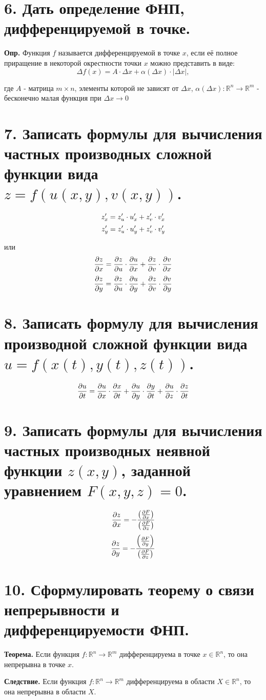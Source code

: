 \documentclass[11pt]{article}
\begin{document}
\section*{6. Дать определение ФНП, дифференцируемой в точке.}
\par\textbf{Опр.} Функция $f$ называется дифференцируемой в точке $x$, если её полное приращение в некоторой окрестности точки $x$ можно представить в виде:
$$\Delta f(x) = A \cdot \Delta x + \alpha(\Delta x) \cdot |\Delta x|,$$
\par где $A$ - матрица $m \times n$, элементы которой не зависят от $\Delta x$, $\alpha(\Delta x): \mathbb{R}^{n} \to \mathbb{R}^{m}$ - бесконечно малая функция при $\Delta x \to 0$
\section*{7. Записать формулы для вычисления частных производных сложной функции вида $z = f(u(x, y), v(x, y))$.}
$$\large z'_{x} = z'_{u} \cdot u'_{x} + z'_{v} \cdot v'_{x}$$
$$\large z'_{y} = z'_{u} \cdot u'_{y} + z'_{v} \cdot v'_{y}$$
\par или
$$\large \frac{\partial z}{\partial x} = \frac{\partial z}{\partial u} \cdot\frac{\partial u}{\partial x} + \frac{\partial z}{\partial v} \cdot \frac{\partial v}{\partial x}$$
$$\large \frac{\partial z}{\partial y} = \frac{\partial z}{\partial u} \cdot\frac{\partial u}{\partial y} + \frac{\partial z}{\partial v} \cdot \frac{\partial v}{\partial y}$$
\section*{8. Записать формулу для вычисления производной сложной функции вида $u = f(x(t), y(t), z(t))$.}
$$\large \frac{\partial u}{\partial t} = \frac{\partial u}{\partial x} \cdot \frac{\partial x}{\partial t} + \frac{\partial u}{\partial y} \cdot \frac{\partial y}{\partial t} + \frac{\partial u}{\partial z} \cdot \frac{\partial z}{\partial t}$$
\section*{9. Записать формулы для вычисления частных производных неявной функции $z(x, y)$, заданной уравнением $F(x, y, z) = 0$.}
$$\Large \frac{\partial z}{\partial x} = -\frac{\left(\frac{\partial F}{\partial x}\right)}{\left(\frac{\partial F}{\partial z}\right)}$$
$$\Large \frac{\partial z}{\partial y} = -\frac{\left(\frac{\partial F}{\partial y}\right)}{\left(\frac{\partial F}{\partial z}\right)}$$
\section*{10. Сформулировать теорему о связи непрерывности и дифференцируемости ФНП.}
\par\textbf{Теорема.} Если функция $f: \mathbb{R}^{n} \to \mathbb{R}^{m}$ дифференцируема в точке $x \in \mathbb{R}^{n}$, то она непрерывна в точке $x$.
\par\textbf{Следствие.} Если функция $f: \mathbb{R}^{n} \to \mathbb{R}^{m}$ дифференцируема в области $X \in \mathbb{R}^{n}$, то она непрерывна в области $X$.
\end{document}
